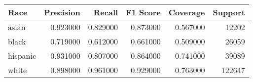 \begin{tabular}{lrrrrr}
\toprule
Race & Precision & Recall & F1 Score & Coverage & Support \\
\midrule
asian & 0.923000 & 0.829000 & 0.873000 & 0.567000 & 12202 \\
black & 0.719000 & 0.612000 & 0.661000 & 0.509000 & 26059 \\
hispanic & 0.931000 & 0.807000 & 0.864000 & 0.741000 & 39089 \\
white & 0.898000 & 0.961000 & 0.929000 & 0.763000 & 122647 \\
\bottomrule
\end{tabular}
